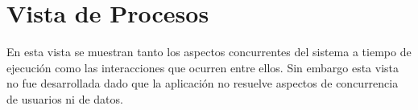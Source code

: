 \vskip 2cm

\section{Vista de Procesos} \label{vistaProcesos}
En esta vista se muestran tanto los aspectos concurrentes del sistema a tiempo de ejecución como las interacciones que ocurren entre ellos. Sin embargo esta vista no fue desarrollada dado que la aplicación no resuelve aspectos de concurrencia de usuarios ni de datos.

